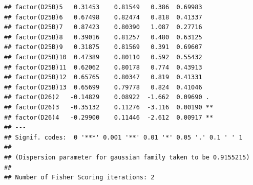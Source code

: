 \documentclass[
]{article}
\begin{document}
\begin{verbatim}
## factor(D25B)5   0.31453    0.81549   0.386  0.69983    
## factor(D25B)6   0.67498    0.82474   0.818  0.41337    
## factor(D25B)7   0.87423    0.80390   1.087  0.27716    
## factor(D25B)8   0.39016    0.81257   0.480  0.63125    
## factor(D25B)9   0.31875    0.81569   0.391  0.69607    
## factor(D25B)10  0.47389    0.80110   0.592  0.55432    
## factor(D25B)11  0.62062    0.80178   0.774  0.43913    
## factor(D25B)12  0.65765    0.80347   0.819  0.41331    
## factor(D25B)13  0.65699    0.79778   0.824  0.41046    
## factor(D26)2   -0.14829    0.08922  -1.662  0.09690 .  
## factor(D26)3   -0.35132    0.11276  -3.116  0.00190 ** 
## factor(D26)4   -0.29900    0.11446  -2.612  0.00917 ** 
## ---
## Signif. codes:  0 '***' 0.001 '**' 0.01 '*' 0.05 '.' 0.1 ' ' 1
## 
## (Dispersion parameter for gaussian family taken to be 0.9155215)
## 
## Number of Fisher Scoring iterations: 2
\end{verbatim}
\end{document}
